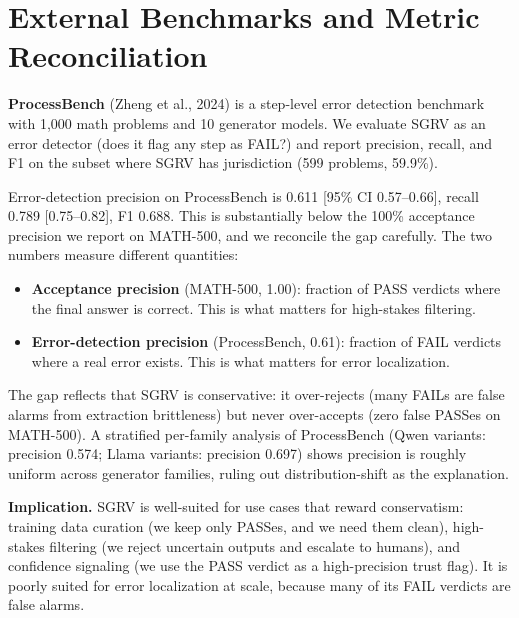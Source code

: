 \documentclass{article}
\begin{document}
\section{External Benchmarks and Metric Reconciliation}
\label{sec:external}

\textbf{ProcessBench} (Zheng et al., 2024) is a step-level error detection benchmark with 1,000 math problems and 10 generator models. We evaluate SGRV as an error detector (does it flag any step as FAIL?) and report precision, recall, and F1 on the subset where SGRV has jurisdiction (599 problems, 59.9\%).

Error-detection precision on ProcessBench is 0.611 [95\% CI 0.57--0.66], recall 0.789 [0.75--0.82], F1 0.688. This is substantially below the 100\% acceptance precision we report on MATH-500, and we reconcile the gap carefully. The two numbers measure different quantities:

\begin{itemize}[leftmargin=*,itemsep=1pt]
\item \textbf{Acceptance precision} (MATH-500, 1.00): fraction of PASS verdicts where the final answer is correct. This is what matters for high-stakes filtering.
\item \textbf{Error-detection precision} (ProcessBench, 0.61): fraction of FAIL verdicts where a real error exists. This is what matters for error localization.
\end{itemize}

The gap reflects that SGRV is conservative: it over-rejects (many FAILs are false alarms from extraction brittleness) but never over-accepts (zero false PASSes on MATH-500). A stratified per-family analysis of ProcessBench (Qwen variants: precision 0.574; Llama variants: precision 0.697) shows precision is roughly uniform across generator families, ruling out distribution-shift as the explanation.

\textbf{Implication.} SGRV is well-suited for use cases that reward conservatism: training data curation (we keep only PASSes, and we need them clean), high-stakes filtering (we reject uncertain outputs and escalate to humans), and confidence signaling (we use the PASS verdict as a high-precision trust flag). It is poorly suited for error localization at scale, because many of its FAIL verdicts are false alarms.

\end{document}
